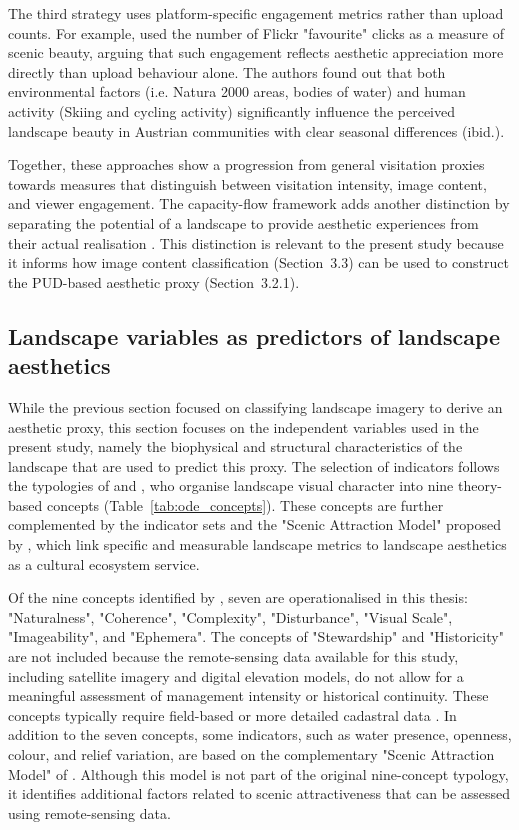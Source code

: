 \documentclass[11pt]{article}
\renewcommand{\_}{\textunderscore\allowbreak{}}
\begin{document}
The third strategy uses platform-specific engagement metrics rather than upload counts. For example, \citet{despotovic_beautiful_2025} used the number of Flickr "favourite" clicks as a measure of scenic beauty, arguing that such engagement reflects aesthetic appreciation more directly than upload behaviour alone. The authors found out that both environmental factors (i.e. Natura 2000 areas, bodies of water) and human activity (Skiing and cycling activity) significantly influence the perceived landscape beauty in Austrian communities with clear seasonal differences (ibid.).

Together, these approaches show a progression from general visitation proxies towards measures that distinguish between visitation intensity, image content, and viewer engagement. The capacity-flow framework adds another distinction by separating the potential of a landscape to provide aesthetic experiences from their actual realisation \citep{langemeyer_mapping_2018}. This distinction is relevant to the present study because it informs how image content classification (Section~3.3) can be used to construct the PUD-based aesthetic proxy (Section~3.2.1).


\subsection{Landscape variables as predictors of landscape aesthetics}\label{sec:LandscapeVariables}

While the previous section focused on classifying landscape imagery to derive an aesthetic proxy, this section focuses on the independent variables used in the present study, namely the biophysical and structural characteristics of the landscape that are used to predict this proxy. The selection of indicators follows the typologies of \citet{tveit_key_2006} and \citet{ode_capturing_2008}, who organise landscape visual character into nine theory-based concepts (Table~\ref{tab:ode_concepts}). These concepts are further complemented by the indicator sets and the "Scenic Attraction Model" proposed by \citet{frank_landscape_2017}, which link specific and measurable landscape metrics to landscape aesthetics as a cultural ecosystem service.

Of the nine concepts identified by \citet{tveit_key_2006}, seven are operationalised in this thesis: "Naturalness", "Coherence", "Complexity", "Disturbance", "Visual Scale", "Imageability", and "Ephemera". The concepts of "Stewardship" and "Historicity" are not included because the remote-sensing data available for this study, including satellite imagery and digital elevation models, do not allow for a meaningful assessment of management intensity or historical continuity. These concepts typically require field-based or more detailed cadastral data \citep{ode_capturing_2008}. In addition to the seven concepts, some indicators, such as water presence, openness, colour, and relief variation, are based on the complementary "Scenic Attraction Model" of \citet{frank_landscape_2017}. Although this model is not part of the original nine-concept typology, it identifies additional factors related to scenic attractiveness that can be assessed using remote-sensing data.
\end{document}
